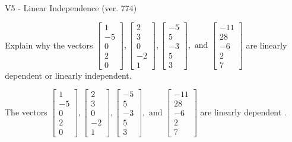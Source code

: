 \begin{exercise}
  \begin{exerciseTitle}V5 - Linear Independence (ver. 774)\end{exerciseTitle}
  \begin{exerciseStatement}
    Explain why the vectors \(\left[\begin{array}{r}
1 \\
-5 \\
0 \\
2 \\
0
\end{array}\right] , \left[\begin{array}{r}
2 \\
3 \\
0 \\
-2 \\
1
\end{array}\right] , \left[\begin{array}{r}
-5 \\
5 \\
-3 \\
5 \\
3
\end{array}\right] , \text{ and } \left[\begin{array}{r}
-11 \\
28 \\
-6 \\
2 \\
7
\end{array}\right]\) are linearly dependent or linearly independent.	


  \end{exerciseStatement}
  \begin{exerciseAnswer}
   The vectors \(\left[\begin{array}{r}
1 \\
-5 \\
0 \\
2 \\
0
\end{array}\right] , \left[\begin{array}{r}
2 \\
3 \\
0 \\
-2 \\
1
\end{array}\right] , \left[\begin{array}{r}
-5 \\
5 \\
-3 \\
5 \\
3
\end{array}\right] , \text{ and } \left[\begin{array}{r}
-11 \\
28 \\
-6 \\
2 \\
7
\end{array}\right]\) are 
  	 linearly dependent  .
  


  \end{exerciseAnswer}
\end{exercise}